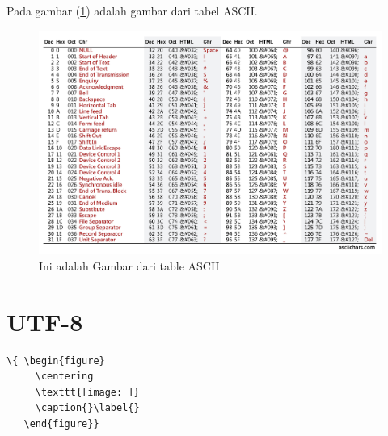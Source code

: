     Pada gambar (\ref{fig:ASCII}) adalah gambar dari tabel ASCII.
\begin{figure}[!htbp]
  \centering
  \includegraphics[width=.75\textwidth]{figures/Standar/ASCII.jpg}
  \caption{Ini adalah Gambar dari table ASCII}\label{fig:ASCII}
\end{figure}

\section{UTF-8}
\begin{lstlisting}
\{ \begin{figure}
     \centering
     \texttt{[image: ]}
     \caption{}\label{}
   \end{figure}}
\end{lstlisting} 